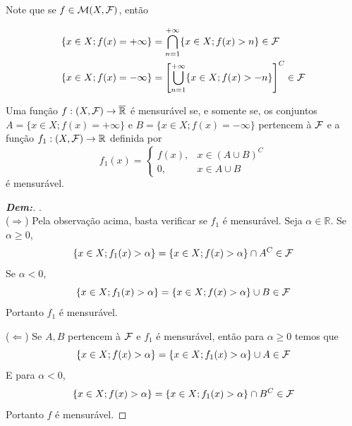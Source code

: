 \noindent
Note que se $f \in \mathcal{M}(X,\mathcal{F})$, então %

\begin{align*}
  \{x \in X; f(x) = +\infty\} &= \bigcap_{n=1}^{+\infty} \{x \in X; f(x) > n\} \in \mathcal{F}\\
  \{x \in X; f(x) = -\infty\} &= \left[ \bigcup_{n=1}^{+\infty} 
  \{x \in X; f(x) > -n\} \right]^C \in \mathcal{F}
\end{align*}

\begin{lemma*}{}
Uma função $f: (X,\mathcal{F}) \rightarrow \overline{\mathbb{R}}$ é mensurável se, e somente se, os conjuntos $A = \{x \in X; f(x) = +\infty\}$ e $B = \{x \in X; f(x) = -\infty\}$ pertencem à $\mathcal{F}$ e a função $f_1: (X,\mathcal{F}) \rightarrow \mathbb{R}$ definida por %
$$ f_1(x) = \begin{cases} 
f(x), & x \in (A \cup B)^C \\ 
0, & x \in A \cup B 
\end{cases} $$ %
é mensurável. %
\end{lemma*}
\begin{proof}[\textbf{Dem:}]. \\

\noindent
($\Rightarrow$) Pela observação acima, basta verificar se $f_1$ é mensurável. Seja $\alpha \in \mathbb{R}$. %
Se $\alpha \ge 0$,
$$ \{x \in X; f_1(x) > \alpha\} = \{x \in X; f(x) > \alpha\} \cap A^C \in \mathcal{F} $$ %
Se $\alpha < 0$, 
$$ \{x \in X; f_1(x) > \alpha\} = \{x \in X; f(x) > \alpha\} \cup B \in \mathcal{F} $$ %
Portanto $f_1$ é mensurável. %
  \vspace{5mm}

\noindent
($\Leftarrow$) Se $A, B$ pertencem à $\mathcal{F}$ e $f_1$ é mensurável, então para $\alpha \ge 0$ temos que %
$$ \{x \in X; f(x) > \alpha\} = \{x \in X; f_1(x) > \alpha\} \cup A \in \mathcal{F} $$ %
E para $\alpha < 0$, %
$$ \{x \in X; f(x) > \alpha\} = \{x \in X; f_1(x) > \alpha\} \cap B^C \in \mathcal{F} $$ %
Portanto $f$ é mensurável. %
\end{proof}

